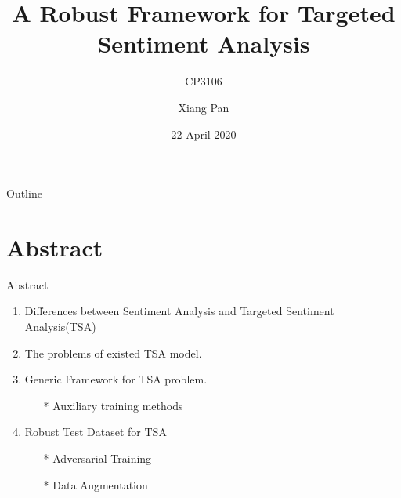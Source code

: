 \documentclass[xcolor=dvipsnames]{beamer}
\title{A Robust Framework for Targeted Sentiment Analysis}
\subtitle{CP3106}
\author{Xiang Pan}
\institute[National University of Singapore] %
{
  Department of Computer Science\\
  National University of Singapore
}
\date{22 April 2020}
\begin{document}
\setcounter{secnumdepth}{5}
\begin{frame}
  \titlepage
\end{frame}

\begin{frame}{Outline}
  \setcounter{tocdepth}{1}
  \tableofcontents
\end{frame}

\section{Abstract}

\begin{frame}{Abstract}
  

  \begin{enumerate}
  \item 
  {
   Differences between Sentiment Analysis and Targeted Sentiment Analysis(TSA)
  }
  \item 
  {
    The problems of existed TSA model.
  }
  \item 
  {
    Generic Framework for TSA problem.
    \begin{itemize}
      \item[*] Auxiliary training methods
    \end{itemize}
  }
  \item 
  {
    Robust Test Dataset for TSA
    \begin{itemize}
      \item[*] Adversarial Training
      \item[*] Data Augmentation 
    \end{itemize}
  }
  \end{enumerate}
\end{frame}
\end{document}
